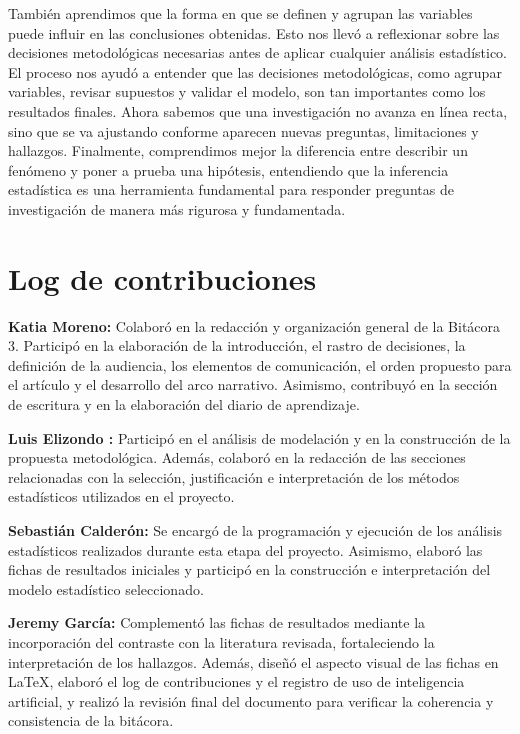 \documentclass[12pt]{article}
\begin{document}
También aprendimos que la forma en que se definen y agrupan las variables puede influir en las conclusiones obtenidas. Esto nos llevó a reflexionar sobre las decisiones metodológicas necesarias antes de aplicar cualquier análisis estadístico. El proceso nos ayudó a entender que las decisiones metodológicas, como agrupar variables, revisar supuestos y validar el modelo, son tan importantes como los resultados finales. Ahora sabemos que una investigación no avanza en línea recta, sino que se va ajustando conforme aparecen nuevas preguntas, limitaciones y hallazgos. Finalmente, comprendimos mejor la diferencia entre describir un fenómeno y poner a prueba una hipótesis, entendiendo que la inferencia estadística es una herramienta fundamental para responder preguntas de investigación de manera más rigurosa y fundamentada.


\section{Log de contribuciones}
\begin{tcolorbox}[
colback=gray!5,
colframe=black!75,
title={Log de contribuciones},
fonttitle=\bfseries
]

\textbf{Katia Moreno:} Colaboró en la redacción y organización general de la Bitácora 3. Participó en la elaboración de la introducción, el rastro de decisiones, la definición de la audiencia, los elementos de comunicación, el orden propuesto para el artículo y el desarrollo del arco narrativo. Asimismo, contribuyó en la sección de escritura y en la elaboración del diario de aprendizaje.

\vspace{0.3cm}

\textbf{Luis Elizondo :} Participó en el análisis de modelación y en la construcción de la propuesta metodológica. Además, colaboró en la redacción de las secciones relacionadas con la selección, justificación e interpretación de los métodos estadísticos utilizados en el proyecto.

\vspace{0.3cm}

\textbf{Sebastián Calderón:} Se encargó de la programación y ejecución de los análisis estadísticos realizados durante esta etapa del proyecto. Asimismo, elaboró las fichas de resultados iniciales y participó en la construcción e interpretación del modelo estadístico seleccionado.

\vspace{0.3cm}

\textbf{Jeremy García:} Complementó las fichas de resultados mediante la incorporación del contraste con la literatura revisada, fortaleciendo la interpretación de los hallazgos. Además, diseñó el aspecto visual de las fichas en \LaTeX{}, elaboró el log de contribuciones y el registro de uso de inteligencia artificial, y realizó la revisión final del documento para verificar la coherencia y consistencia de la bitácora.

\end{tcolorbox}
\end{document}
